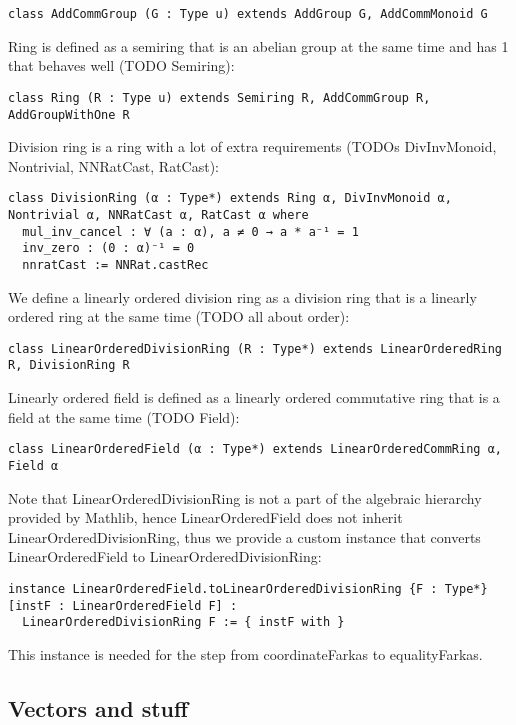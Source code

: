 \documentclass[]{article}
\renewcommand{\.}{\hskip .75pt}
\begin{document}
\begin{lstlisting}
class AddCommGroup (G : Type u) extends AddGroup G, AddCommMonoid G
\end{lstlisting}
Ring is defined as a semiring that is an abelian group at the same time and has 1 that behaves well (TODO Semiring):
\begin{lstlisting}
class Ring (R : Type u) extends Semiring R, AddCommGroup R, AddGroupWithOne R
\end{lstlisting}
Division ring is a ring with a lot of extra requirements (TODOs DivInvMonoid, Nontrivial, NNRatCast, RatCast):
\begin{lstlisting}
class DivisionRing (α : Type*) extends Ring α, DivInvMonoid α, Nontrivial α, NNRatCast α, RatCast α where
  mul_inv_cancel : ∀ (a : α), a ≠ 0 → a * a⁻¹ = 1
  inv_zero : (0 : α)⁻¹ = 0
  nnratCast := NNRat.castRec
\end{lstlisting}
We define a linearly ordered division ring as a division ring that is a linearly ordered ring at the same time (TODO all about order):
\begin{lstlisting}
class LinearOrderedDivisionRing (R : Type*) extends LinearOrderedRing R, DivisionRing R
\end{lstlisting}
Linearly ordered field is defined as a linearly ordered commutative ring that is a field at the same time (TODO Field):
\begin{lstlisting}
class LinearOrderedField (α : Type*) extends LinearOrderedCommRing α, Field α
\end{lstlisting}
Note that LinearOrderedDivisionRing is not a part of the algebraic hierarchy provided by Mathlib,
hence LinearOrderedField does not inherit LinearOrderedDivisionRing, thus we provide a custom
instance that converts LinearOrderedField to LinearOrderedDivisionRing:
\begin{lstlisting}
instance LinearOrderedField.toLinearOrderedDivisionRing {F : Type*} [instF : LinearOrderedField F] :
  LinearOrderedDivisionRing F := { instF with }
\end{lstlisting}
This instance is needed for the step from coordinateFarkas to equalityFarkas.

\subsection{Vectors and stuff}
\end{document}
